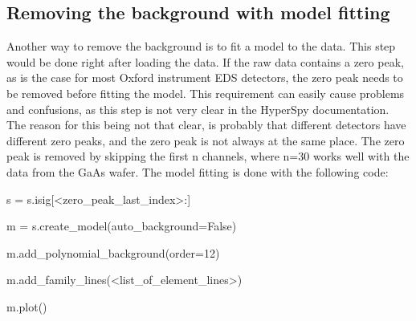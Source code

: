 \subsection{Removing the background with model fitting}
\label{sec:discussion:steps:model_fitting}
Another way to remove the background is to fit a model to the data.
This step would be done right after loading the data.
If the raw data contains a zero peak, as is the case for most Oxford instrument EDS detectors, the zero peak needs to be removed before fitting the model.
This requirement can easily cause problems and confusions, as this step is not very clear in the HyperSpy documentation.
The reason for this being not that clear, is probably that different detectors have different zero peaks, and the zero peak is not always at the same place.
The zero peak is removed by skipping the first n channels, where n=30 works well with the data from the GaAs wafer.
The model fitting is done with the following code:







\begin{lcverbatim}
    s = s.isig[<zero_peak_last_index>:]

    m = s.create_model(auto_background=False)

    m.add_polynomial_background(order=12)

    m.add_family_lines(<list_of_element_lines>)

    m.plot()

\end{lcverbatim}

